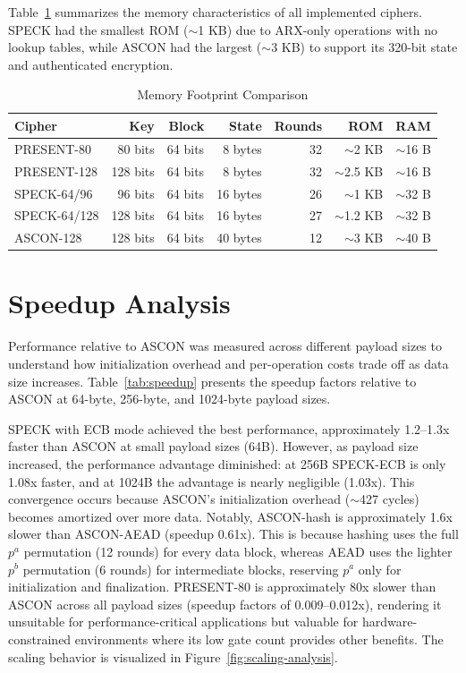 \documentclass[12pt]{report}
\begin{document}
Table~\ref{tab:memory-footprint} summarizes the memory characteristics of all implemented ciphers.
SPECK had the smallest ROM ($\sim$1 KB) due to ARX-only operations with no lookup tables, while ASCON
had the largest ($\sim$3 KB) to support its 320-bit state and authenticated encryption.

\begin{table}[H]
    \centering
    \begin{tabular}{lrrrrrr}
        \toprule
        \textbf{Cipher} & \textbf{Key} & \textbf{Block} & \textbf{State} & \textbf{Rounds} & \textbf{ROM} & \textbf{RAM} \\
        \midrule
        PRESENT-80 & 80 bits & 64 bits & 8 bytes & 32 & $\sim$2 KB & $\sim$16 B \\
        PRESENT-128 & 128 bits & 64 bits & 8 bytes & 32 & $\sim$2.5 KB & $\sim$16 B \\
        SPECK-64/96 & 96 bits & 64 bits & 16 bytes & 26 & $\sim$1 KB & $\sim$32 B \\
        SPECK-64/128 & 128 bits & 64 bits & 16 bytes & 27 & $\sim$1.2 KB & $\sim$32 B \\
        ASCON-128 & 128 bits & 64 bits & 40 bytes & 12 & $\sim$3 KB & $\sim$40 B \\
        \bottomrule
    \end{tabular}
\caption{Memory Footprint Comparison}
\label{tab:memory-footprint}
\end{table}


\section{Speedup Analysis}

Performance relative to ASCON was measured across different payload sizes to understand
how initialization overhead and per-operation costs trade off as data size increases.
Table~\ref{tab:speedup} presents the speedup factors relative to ASCON at 64-byte, 256-byte,
and 1024-byte payload sizes.

SPECK with ECB mode achieved the best performance, approximately 1.2--1.3x faster than ASCON
at small payload sizes (64B). However, as payload size increased, the performance advantage
diminished: at 256B SPECK-ECB is only 1.08x faster, and at 1024B the advantage is nearly
negligible (1.03x). This convergence occurs because ASCON's initialization overhead
($\sim$427 cycles) becomes amortized over more data. Notably, ASCON-hash is
approximately 1.6x slower than ASCON-AEAD (speedup 0.61x). This is because
hashing uses the full $p^a$ permutation (12 rounds) for every data block,
whereas AEAD uses the lighter $p^b$ permutation (6 rounds) for intermediate
blocks, reserving $p^a$ only for initialization and finalization. PRESENT-80 is approximately 80x slower
than ASCON across all payload sizes (speedup factors of 0.009--0.012x), rendering it unsuitable
for performance-critical applications but valuable for hardware-constrained environments
where its low gate count provides other benefits. The scaling behavior is visualized in
Figure~\ref{fig:scaling-analysis}.
\end{document}

